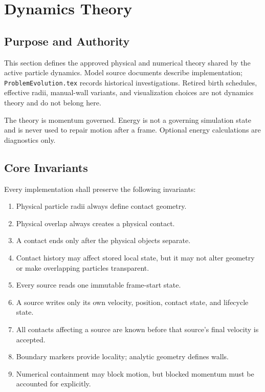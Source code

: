 \section{Dynamics Theory}

\subsection{Purpose and Authority}

This section defines the approved physical and numerical theory shared by the
active particle dynamics.  Model source documents describe implementation;
\texttt{ProblemEvolution.tex} records historical investigations.  Retired
birth schedules, effective radii, manual-wall variants, and visualization
choices are not dynamics theory and do not belong here.

The theory is momentum governed.  Energy is not a governing simulation state
and is never used to repair motion after a frame.  Optional energy calculations
are diagnostics only.

\subsection{Core Invariants}

Every implementation shall preserve the following invariants:

\begin{enumerate}
    \item Physical particle radii always define contact geometry.
    \item Physical overlap always creates a physical contact.
    \item A contact ends only after the physical objects separate.
    \item Contact history may affect stored local state, but it may not alter
          geometry or make overlapping particles transparent.
    \item Every source reads one immutable frame-start state.
    \item A source writes only its own velocity, position, contact state, and
          lifecycle state.
    \item All contacts affecting a source are known before that source's final
          velocity is accepted.
    \item Boundary markers provide locality; analytic geometry defines walls.
    \item Numerical containment may block motion, but blocked momentum must be
          accounted for explicitly.
\end{enumerate}

